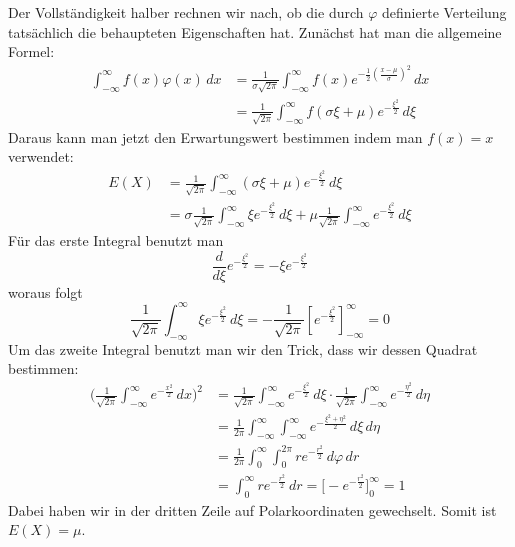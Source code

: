 Der Vollständigkeit halber rechnen wir nach, ob die durch $\varphi$
definierte Verteilung tatsächlich die behaupteten Eigenschaften hat.
Zunächst hat man die allgemeine Formel:
\begin{align*}
\int_{-\infty}^{\infty}f(x)\varphi(x)\,dx
&=\frac1{\sigma\sqrt{2\pi}}\int_{-\infty}^{\infty}f(x)e^{-\frac{1}{2}\left(\frac{x-\mu}{\sigma}\right)^2}\,dx\\
&=\frac1{\sqrt{2\pi}}\int_{-\infty}^{\infty}f(\sigma\xi+\mu)e^{-\frac{\xi^2}2}\,d\xi
\end{align*}
Daraus kann man jetzt den Erwartungswert bestimmen indem man $f(x)=x$ verwendet:
\begin{align*}
E(X)
&=\frac1{\sqrt{2\pi}}\int_{-\infty}^{\infty}(\sigma\xi+\mu)e^{-\frac{\xi^2}2}\,d\xi\\
&=\sigma\frac1{\sqrt{2\pi}}\int_{-\infty}^{\infty}\xi e^{-\frac{\xi^2}2}\,d\xi+
\mu\frac1{\sqrt{2\pi}}\int_{-\infty}^{\infty}e^{-\frac{\xi^2}2}\,d\xi
\end{align*}
Für das erste Integral benutzt man
\[
\frac{d}{d\xi}e^{-\frac{\xi^2}{2}}=-\xi e^{-\frac{\xi^2}{2}}
\]
woraus folgt
\[
\frac1{\sqrt{2\pi}}\int_{-\infty}^{\infty}\xi e^{-\frac{\xi^2}2}\,d\xi
=
-\frac1{\sqrt{2\pi}}\left[
 e^{-\frac{\xi^2}2}
\right]_{-\infty}^{\infty}=0
\]
Um das zweite Integral benutzt man wir den Trick, dass wir dessen
Quadrat bestimmen:
\begin{align*}
\biggl(\frac{1}{\sqrt{2\pi}}\int_{-\infty}^{\infty}e^{-\frac{x^2}2}\,dx\biggr)^2
&=
\frac1{\sqrt{2\pi}}\int_{-\infty}^{\infty} e^{-\frac{\xi^2}2}\,d\xi\cdot
\frac1{\sqrt{2\pi}}\int_{-\infty}^{\infty} e^{-\frac{\eta^2}2}\,d\eta\\
&=
\frac1{2\pi}\int_{-\infty}^{\infty}\int_{-\infty}^{\infty}
e^{-\frac{\xi^2+\eta^2}2}
\,d\xi\,d\eta\\
&=
\frac1{2\pi}\int_{0}^{\infty}\int_{0}^{2\pi}re^{-\frac{r^2}2}\,d\varphi\,dr\\
&=\int_0^{\infty}re^{-\frac{r^2}2}\,dr
=\bigl[-e^{-\frac{r^2}2}\bigr]_0^{\infty}
=1
\end{align*}
Dabei haben wir in der dritten Zeile auf Polarkoordinaten gewechselt.
Somit ist $E(X)=\mu$.

